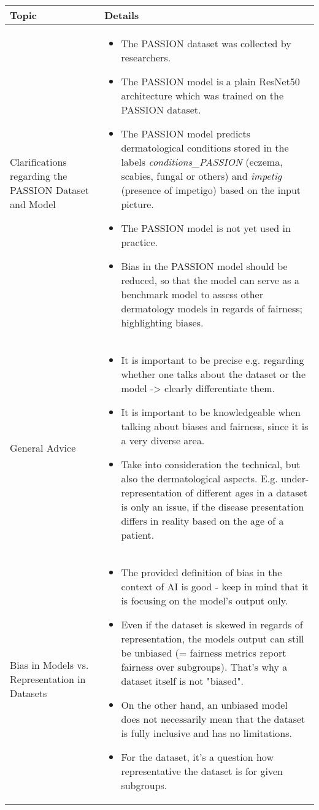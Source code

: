 \documentclass[a4paper,11pt]{article}
\begin{document}
	\renewcommand{\arraystretch}{1.5}
	\begin{longtable}{|>{\raggedright\arraybackslash}p{3.5cm}|>{\vspace{-\baselineskip}}p{12cm}|}
		\hline
		\textbf{Topic} & \textbf{Details} \\
		\hline
		Clarifications regarding the PASSION Dataset and Model & 
		\begin{itemize}
			\item The PASSION dataset was collected by researchers.
			\item The PASSION model is a plain ResNet50 architecture which was trained on the PASSION dataset.
			\item The PASSION model predicts dermatological conditions stored in the labels \textit{conditions\_PASSION} 
			(eczema, scabies, fungal or others) and \textit{impetig} (presence of impetigo) based on the input picture.
			\item The PASSION model is not yet used in practice.
			\item Bias in the PASSION model should be reduced, so that the model can serve as a benchmark model to assess other dermatology models in regards of fairness; highlighting biases.
		\end{itemize} \\
		\hline
		
		General Advice &
		\begin{itemize}
			\item It is important to be precise e.g. regarding whether one talks about the dataset or the model -> clearly differentiate them.
			\item It is important to be knowledgeable when talking about biases and fairness, since it is a very diverse area.
			\item Take into consideration the technical, but also the dermatological aspects. E.g. under-representation of different ages in a dataset is only an issue, if the disease presentation differs in reality based on the age of a patient.
		\end{itemize} \\
		\hline
		
		Bias in Models vs. Representation in Datasets &
		\begin{itemize}
			\item The provided definition of bias in the context of AI is good - keep in mind that it is focusing on the model's output only.
			\item Even if the dataset is skewed in regards of representation, the models output can still be unbiased (= fairness metrics report fairness over subgroups). That's why a dataset itself is not "biased".
			\item On the other hand, an unbiased model does not necessarily mean that the dataset is fully inclusive and has no limitations.
			\item For the dataset, it's a question how representative the dataset is for given subgroups.
		\end{itemize} \\
		\hline
		

\end{longtable}
\end{document}
